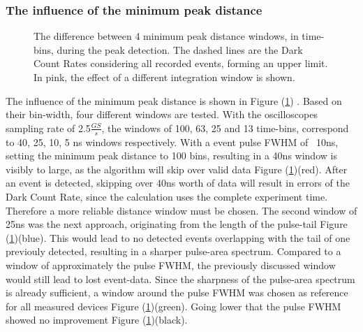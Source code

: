 \documentclass[12pt,article,type=msc,colorback,accentcolor=tud9c]{tudthesis}
\begin{document}
\subsubsection{The influence of the minimum peak distance}
\label{subsec:subsec_mpd}
\begin{figure}[h]
\begin{centering}
\caption{The difference between 4 minimum peak distance windows, in time-bins, during the peak detection. The dashed lines are the Dark Count Rates considering all recorded events, forming an upper limit. In pink, the effect of a different integration window is shown.}
\label{fig:MPD_plot}
\end{centering}
\end{figure}
The influence of the minimum peak distance is shown in Figure (\ref{fig:MPD_plot}) . Based on their bin-width, four different windows are tested. With the oscilloscopes sampling rate of 2.5$\frac{GS}{s}$, the windows of 100, 63, 25 and 13 time-bins, correspond to 40, 25, 10, 5 ns windows respectively. With a event pulse FWHM of ~10ns, setting the minimum peak distance to 100 bins, resulting in a 40ns window is visibly to large, as the algorithm will skip over valid data Figure (\ref{fig:MPD_plot})(red). After an event is detected, skipping over 40ns worth of data will result in errors of the Dark Count Rate, since the calculation uses the complete experiment time. Therefore a more reliable distance window must be chosen. The second window of 25ns was the next approach, originating from the length of the pulse-tail Figure (\ref{fig:MPD_plot})(blue). This would lead to no detected events overlapping with the tail of one previouly detected, resulting in a sharper pulse-area spectrum. Compared to a window of approximately the pulse FWHM, the previously discussed window would still lead to lost event-data. Since the sharpness of the pulse-area spectrum is already sufficient, a window around the pulse FWHM was chosen as reference for all measured devices Figure (\ref{fig:MPD_plot})(green). Going lower that the pulse FWHM showed no improvement Figure (\ref{fig:MPD_plot})(black). 
\end{document}
